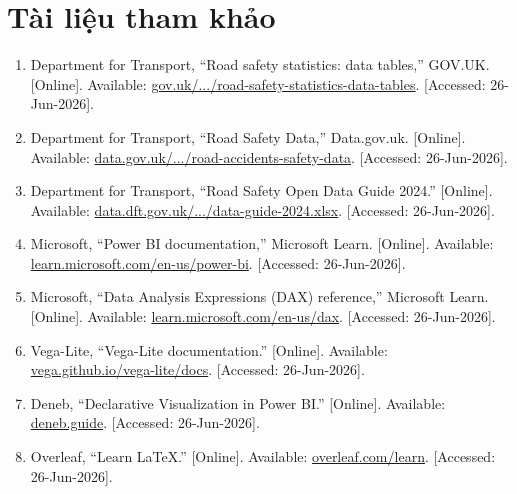 \newpage
\section{Tài liệu tham khảo}
\label{sec:references}

\begingroup
\sloppy
\begin{enumerate}
    \item[{[1]}]
    Department for Transport, ``Road safety statistics: data tables,'' GOV.UK. [Online]. Available:
    \href{https://www.gov.uk/government/statistical-data-sets/road-safety-statistics-data-tables}{gov.uk/.../road-safety-statistics-data-tables}. [Accessed: 26-Jun-2026].

    \item[{[2]}]
    Department for Transport, ``Road Safety Data,'' Data.gov.uk. [Online]. Available:
    \href{https://www.data.gov.uk/dataset/cb7ae6f0-4be6-4935-9277-47e5ce24a11f/road-accidents-safety-data}{data.gov.uk/.../road-accidents-safety-data}. [Accessed: 26-Jun-2026].

    \item[{[3]}]
    Department for Transport, ``Road Safety Open Data Guide 2024.'' [Online]. Available:
    \href{https://data.dft.gov.uk/road-accidents-safety-data/dft-road-casualty-statistics-road-safety-open-dataset-data-guide-2024.xlsx}{data.dft.gov.uk/.../data-guide-2024.xlsx}. [Accessed: 26-Jun-2026].

    \item[{[4]}]
    Microsoft, ``Power BI documentation,'' Microsoft Learn. [Online]. Available:
    \href{https://learn.microsoft.com/en-us/power-bi/}{learn.microsoft.com/en-us/power-bi}. [Accessed: 26-Jun-2026].

    \item[{[5]}]
    Microsoft, ``Data Analysis Expressions (DAX) reference,'' Microsoft Learn. [Online]. Available:
    \href{https://learn.microsoft.com/en-us/dax/}{learn.microsoft.com/en-us/dax}. [Accessed: 26-Jun-2026].

    \item[{[6]}]
    Vega-Lite, ``Vega-Lite documentation.'' [Online]. Available:
    \href{https://vega.github.io/vega-lite/docs/}{vega.github.io/vega-lite/docs}. [Accessed: 26-Jun-2026].

    \item[{[7]}]
    Deneb, ``Declarative Visualization in Power BI.'' [Online]. Available:
    \href{https://deneb.guide/}{deneb.guide}. [Accessed: 26-Jun-2026].

    \item[{[8]}]
    Overleaf, ``Learn LaTeX.'' [Online]. Available:
    \href{https://www.overleaf.com/learn}{overleaf.com/learn}. [Accessed: 26-Jun-2026].
\end{enumerate}
\endgroup
